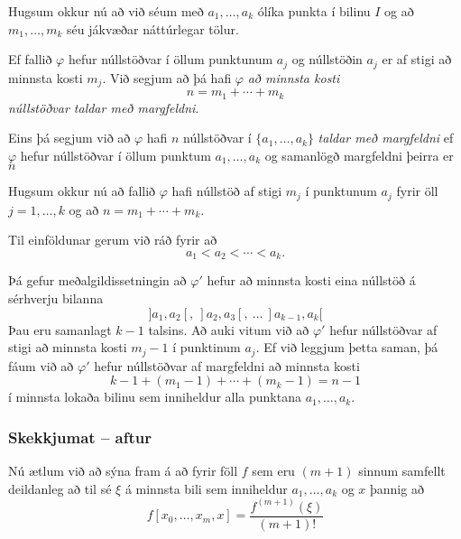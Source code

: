 \documentclass[icelandic,a4paper,12pt]{article}
\begin{document}
Hugsum okkur nú að við séum með $a_1,\dots,a_k$ ólíka punkta í bilinu 
$I$  og að $m_1,\dots,m_k$ séu jákvæðar náttúrlegar tölur.

\pause
Ef fallið $\varphi$ hefur núllstöðvar í öllum punktunum $a_j$ og 
núllstöðin $a_j$ er af stigi að minnsta kosti $m_j$.  Við segjum að þá
hafi $\varphi$ {\it að minnsta kosti} 
$$
n=m_1+\cdots+m_k
$$
{\it núllstöðvar taldar með margfeldni}.

\pause
\smallskip
Eins þá segjum við að  $\varphi$ hafi $n$ núllstöðvar í $\{a_1,\dots,a_k\}$ 
{\it taldar með margfeldni} ef $\varphi$ hefur 
núllstöðvar í öllum punktum $a_1,\dots,a_k$ og samanlögð margfeldni
þeirra er  $n$


Hugsum okkur nú að fallið $\varphi$ hafi núllstöð af stigi 
$m_j$ í punktunum $a_j$ fyrir öll $j=1,\dots,k$ og að
$n=m_1+\cdots+m_k$.  

\pause
\smallskip
Til einföldunar gerum við ráð fyrir að 
$$
a_1<a_2<\cdots<a_k.
$$

\pause
\smallskip
Þá gefur meðalgildissetningin að $\varphi'$ hefur að minnsta kosti eina
núllstöð á sérhverju bilanna 
$$
]a_1,a_2[, \  ]a_2,a_3[, \ \dots \  ]a_{k-1},a_k[ 
$$
Þau eru samanlagt $k-1$ talsins.  Að auki vitum við að 
$\varphi'$ hefur núllstöðvar af stigi að minnsta kosti 
$m_j-1$ í punktinum $a_j$.   Ef við leggjum þetta saman, þá fáum við
að $\varphi'$ hefur núllstöðvar af margfeldni að minnsta kosti 
$$
k-1+(m_1-1)+\cdots+(m_k-1)=n-1
$$
í minnsta lokaða bilinu sem inniheldur alla punktana $a_1,\dots,a_k$.  


\subsubsection{Skekkjumat -- aftur} 
Nú ætlum við að sýna fram á að fyrir föll $f$ sem eru $(m+1)$ sinnum 
samfellt deildanleg að til sé $\xi$ á minnsta bili sem inniheldur 
$a_1, \ldots, a_k$ og $x$ þannig að
\begin{equation*}
  f[x_0,\ldots,x_m,x] = \frac{f^{(m+1)}(\xi)}{(m+1)!}
\end{equation*}
\end{document}
